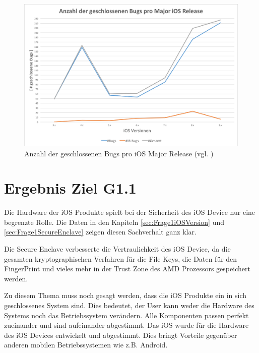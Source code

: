\begin{figure}[hp!]
        \centering
                \includegraphics[scale=0.42]{Bilder/SecUpdateMajor.png}
        \caption{Anzahl der geschlossenen Bugs pro iOS Major Release \newline (vgl. \cite{Apple[7]}) \protect\footnotemark}
        \label{fig:SecUpdateMajor}
\end{figure}
\newpage

\section{Ergebnis Ziel G1.1}
\label{sec:AnalyseG11}
 Die Hardware der iOS Produkte spielt bei der Sicherheit des iOS Device nur eine begrenzte Rolle. Die Daten in den Kapiteln \ref{sec:Frage1iOSVersion} und \ref{sec:Frage1SecureEnclave} zeigen diesen Sachverhalt ganz klar.\par  
Die Secure Enclave verbesserte die Vertraulichkeit des iOS Device, da die gesamten kryptographischen Verfahren für die File Keys, die Daten für den FingerPrint und vieles mehr in der Trust Zone des AMD Prozessors gespeichert werden. \par
Zu diesem Thema muss noch gesagt werden, dass die iOS Produkte ein in sich geschlossenes System sind. Dies bedeutet, der User kann weder die Hardware des Systems noch das Betriebssystem verändern. Alle Komponenten passen perfekt zueinander und sind aufeinander abgestimmt. Das iOS wurde für die Hardware des iOS Devices entwickelt und abgestimmt. Dies bringt Vorteile gegenüber anderen mobilen Betriebssystemen wie z.B. Android.  

